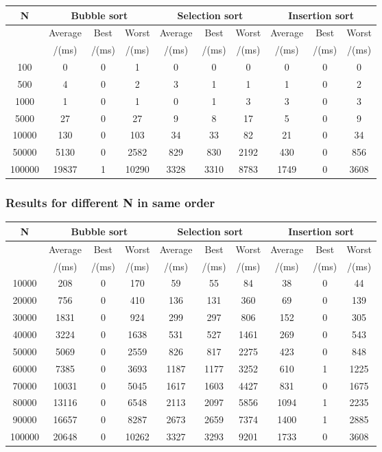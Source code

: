 \documentclass[11pt]{article}
\begin{document}
\begin{tabular}{|c||c|c|c||c|c|c||c|c|c|}
\hline
N&\multicolumn{3}{c}{Bubble sort}&\multicolumn{3}{c}{Selection sort}&\multicolumn{3}{c}{Insertion sort}\\
\hline
&Average & Best & Worst&Average & Best & Worst&Average & Best & Worst\\
&/(ms) &/(ms) &/(ms) &/(ms) &/(ms) &/(ms) &/(ms) &/(ms) &/(ms) \\
\hline

100&0&0&1&0&0&0&0&0&0\\
500&4&0&2&3&1&1&1&0&2\\
1000&1&0&1&0&1&3&3&0&3\\
5000&27&0&27&9&8&17&5&0&9\\
10000&130&0&103&34&33&82&21&0&34\\
50000&5130&0&2582&829&830&2192&430&0&856\\
100000&19837&1&10290&3328&3310&8783&1749&0&3608\\
\hline


\end{tabular}


\subsubsection{Results for different N in same order}

\begin{tabular}{|c||c|c|c||c|c|c||c|c|c|}
\hline
N&\multicolumn{3}{c}{Bubble sort}&\multicolumn{3}{c}{Selection sort}&\multicolumn{3}{c}{Insertion sort}\\
\hline
&Average & Best & Worst&Average & Best & Worst&Average & Best & Worst\\
&/(ms) &/(ms) &/(ms) &/(ms) &/(ms) &/(ms) &/(ms) &/(ms) &/(ms) \\
\hline

10000& 208 &0&170&59&55&84&38&0&44\\
20000& 756 &0&410&136&131&360&69&0&139\\
30000& 1831 &0&924&299&297&806&152&0&305\\
40000& 3224 &0&1638&531&527&1461&269&0&543\\
50000& 5069 &0&2559&826&817&2275&423&0&848\\
60000& 7385 &0&3693&1187&1177&3252&610&1&1225\\
70000& 10031 &0&5045&1617&1603&4427&831&0&1675\\
80000& 13116 &0&6548&2113&2097&5856&1094&1&2235\\
90000& 16657 &0&8287&2673&2659&7374&1400&1&2885\\
100000& 20648 &0&10262&3327&3293&9201&1733&0&3608\\

\hline


\end{tabular}
\end{document}
